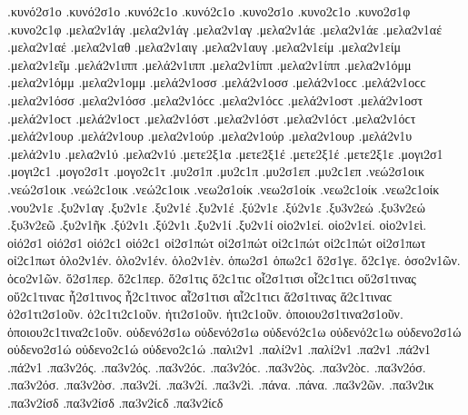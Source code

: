 {.κυνό2σ1ο .κυνό2σ1ο .κυνό2ϲ1ο .κυνό2ϲ1ο   %
.κυνο2σ1ο .κυνο2ϲ1ο
.κυνο2σ1φ .κυνο2ϲ1φ   %
.μελα2ν1άγ .μελα2ν1άγ   %
.μελα2ν1αγ
.μελα2ν1άε .μελα2ν1άε   %
.μελα2ν1αέ .μελα2ν1αέ
.μελα2ν1αθ   %
.μελα2ν1αιγ   %
.μελα2ν1αυγ   %
.μελα2ν1είμ .μελα2ν1είμ   %
.μελα2ν1εῖμ   %
.μελά2ν1ιππ .μελά2ν1ιππ   %
.μελα2ν1ίππ .μελα2ν1ίππ
.μελα2ν1όμμ .μελα2ν1όμμ   %
.μελα2ν1ομμ
.μελά2ν1οσσ .μελά2ν1οσσ .μελά2ν1οϲϲ .μελά2ν1οϲϲ   %
.μελα2ν1όσσ .μελα2ν1όσσ .μελα2ν1όϲϲ .μελα2ν1όϲϲ
.μελά2ν1οστ .μελά2ν1οστ .μελά2ν1οϲτ .μελά2ν1οϲτ   %
.μελα2ν1όστ .μελα2ν1όστ .μελα2ν1όϲτ .μελα2ν1όϲτ
.μελά2ν1ουρ .μελά2ν1ουρ   %
.μελα2ν1ούρ .μελα2ν1ούρ
.μελα2ν1ουρ   %
.μελά2ν1υ .μελά2ν1υ   %
.μελα2ν1ύ .μελα2ν1ύ
.μετε2ξ1α   %
.μετε2ξ1έ .μετε2ξ1έ   %
.μετε2ξ1ε
.μογι2σ1 .μογι2ϲ1   %
.μογο2σ1τ .μογο2ϲ1τ   %
.μυ2σ1π .μυ2ϲ1π   %
.μυ2σ1επ .μυ2ϲ1επ   %
.νεώ2σ1οικ .νεώ2σ1οικ .νεώ2ϲ1οικ .νεώ2ϲ1οικ   %
.νεω2σ1οίκ .νεω2σ1οίκ .νεω2ϲ1οίκ .νεω2ϲ1οίκ
.νου2ν1ε   %
.ξυ2ν1αγ   %
.ξυ2ν1ε
.ξυ2ν1έ .ξυ2ν1έ
.ξύ2ν1ε .ξύ2ν1ε
.ξυ3ν2εώ .ξυ3ν2εώ   %
.ξυ3ν2εῶ
.ξυ2ν1ῆκ   %
.ξύ2ν1ι .ξύ2ν1ι   %
.ξυ2ν1ί .ξυ2ν1ί   %
οἱο2ν1εί. οἱο2ν1εί.   %
οἱο2ν1εὶ.
οἱό2σ1 οἱό2σ1 οἱό2ϲ1 οἱό2ϲ1   %
οἰ2σ1πώτ οἰ2σ1πώτ οἰ2ϲ1πώτ οἰ2ϲ1πώτ   %
οἰ2σ1πωτ οἰ2ϲ1πωτ
ὁλο2ν1έν. ὁλο2ν1έν.
ὁλο2ν1ὲν.
ὁπω2σ1 ὁπω2ϲ1   %
ὅ2σ1γε. ὅ2ϲ1γε.   %
ὁσο2ν1ῶν. ὁϲο2ν1ῶν.   %
ὅ2σ1περ. ὅ2ϲ1περ.   %
ὅ2σ1τις ὅ2ϲ1τιϲ   %
οἷ2σ1τισι οἷ2ϲ1τιϲι   %
οὕ2σ1τινας οὕ2ϲ1τιναϲ   %
ἧ2σ1τινος ἧ2ϲ1τινοϲ   %
αἷ2σ1τισι αἷ2ϲ1τιϲι   %
ἅ2σ1τινας ἅ2ϲ1τιναϲ   %
ὁ2σ1τι2σ1οῦν. ὁ2ϲ1τι2ϲ1οῦν.   %
ἡτι2σ1οῦν. ἡτι2ϲ1οῦν.   %
ὁποιου2σ1τινα2σ1οῦν. ὁποιου2ϲ1τινα2ϲ1οῦν.   %
οὐδενό2σ1ω οὐδενό2σ1ω οὐδενό2ϲ1ω οὐδενό2ϲ1ω   %
οὐδενο2σ1ώ οὐδενο2σ1ώ οὐδενο2ϲ1ώ οὐδενο2ϲ1ώ
.παλι2ν1   %
.παλί2ν1 .παλί2ν1   %
.πα2ν1
.πά2ν1 .πά2ν1
.πα3ν2ός. .πα3ν2ός. .πα3ν2όϲ. .πα3ν2όϲ.   %
.πα3ν2ὸς. .πα3ν2ὸϲ.
.πα3ν2όσ. .πα3ν2όσ.
.πα3ν2ὸσ.
.πα3ν2ί. .πα3ν2ί.
.πα3ν2ὶ.
.πάνα. .πάνα.
.πα3ν2ῶν.
.πα3ν2ικ   %
.πα3ν2ίσδ .πα3ν2ίσδ .πα3ν2ίϲδ .πα3ν2ίϲδ   %
}
